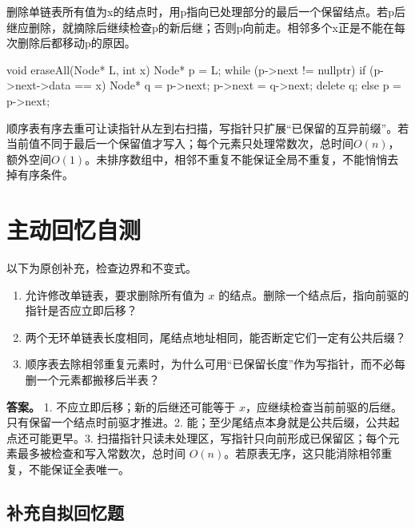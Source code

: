 \begin{methodbox}

删除单链表所有值为x的结点时，用p指向已处理部分的最后一个保留结点。若p后继应删除，就摘除后继续检查p的新后继；否则p向前走。相邻多个x正是不能在每次删除后都移动p的原因。

\end{methodbox}

\begin{codeblock}[language=C++]
void eraseAll(Node* L, int x) {
    Node* p = L;
    while (p->next != nullptr) {
        if (p->next->data == x) {
            Node* q = p->next;
            p->next = q->next;
            delete q;
        } else {
            p = p->next;
        }
    }
}
\end{codeblock}

顺序表有序去重可让读指针从左到右扫描，写指针只扩展``已保留的互异前缀''。若当前值不同于最后一个保留值才写入；每个元素只处理常数次，总时间\(O(n)\)，额外空间\(O(1)\)。未排序数组中，相邻不重复不能保证全局不重复，不能悄悄去掉有序条件。

\section{主动回忆自测}\label{DS02-check}

以下为原创补充，检查边界和不变式。

\begin{enumerate}
\def\labelenumi{\arabic{enumi}.}
\tightlist
\item
  允许修改单链表，要求删除所有值为 \(x\) 的结点。删除一个结点后，指向前驱的指针是否应立即后移？
\item
  两个无环单链表长度相同，尾结点地址相同，能否断定它们一定有公共后缀？
\item
  顺序表去除相邻重复元素时，为什么可用``已保留长度''作为写指针，而不必每删一个元素都搬移后半表？
\end{enumerate}

\textbf{答案。} 1. 不应立即后移；新的后继还可能等于 \(x\)，应继续检查当前前驱的后继。只有保留一个结点时前驱才推进。2. 能；至少尾结点本身就是公共后缀，公共起点还可能更早。3. 扫描指针只读未处理区，写指针只向前形成已保留区；每个元素最多被检查和写入常数次，总时间 \(O(n)\)。若原表无序，这只能消除相邻重复，不能保证全表唯一。

\subsection{补充自拟回忆题}\label{DS02-recall-extra}

